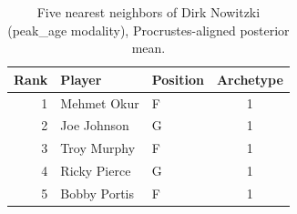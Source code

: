 \begin{table}[htbp]
  \centering\small
  \begin{tabular}{rllc}
    \toprule
    Rank & Player & Position & Archetype \\
    \midrule
    1 & Mehmet Okur & F & 1 \\
    2 & Joe Johnson & G & 1 \\
    3 & Troy Murphy & F & 1 \\
    4 & Ricky Pierce & G & 1 \\
    5 & Bobby Portis & F & 1 \\
    \bottomrule
  \end{tabular}
  \caption{Five nearest neighbors of Dirk Nowitzki (peak_age modality), Procrustes-aligned posterior mean.}
  \label{tab:Dirk_Nowitzki_neighbors_peak_age}
\end{table}

